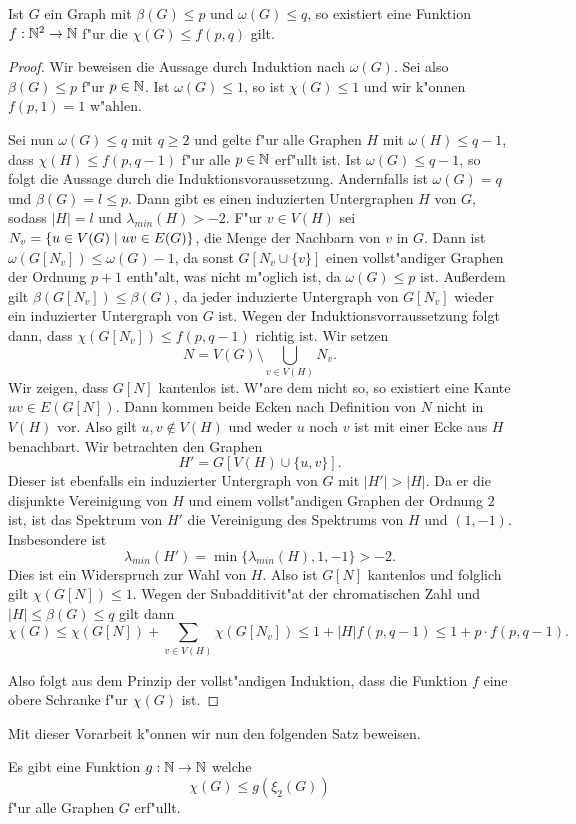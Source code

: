   \begin{lemma}
    Ist $G$ ein Graph mit $\beta(G) \leq p$ und $\omega(G) \leq q$, so existiert eine Funktion $f:{\mathbb{N}} ^{2} \to {\mathbb{N}}$ f"ur die $\chi(G) \leq f(p,q) $ gilt. 
    \label{lem:funktionxilemma}
  \end{lemma}
  \begin{proof}
    Wir beweisen die Aussage durch Induktion nach $\omega(G)$. Sei also $\beta(G) \leq p$ f"ur $p\in {\mathbb{N}}$. Ist $\omega(G) \leq 1$, so ist $\chi(G) \leq 1$ und wir k"onnen $f(p,1) = 1$ w"ahlen.

    Sei nun $\omega(G) \leq q$ mit $q \geq 2$ und gelte f"ur alle Graphen $H$ mit $\omega(H) \leq q-1$, dass $\chi(H) \leq f(p,q-1)$ f"ur alle $p \in {\mathbb{N}}$ erf"ullt ist.
    Ist $\omega(G) \leq q-1$, so folgt die Aussage durch die Induktionsvoraussetzung. Andernfalls ist $\omega(G) = q$ und $\beta(G) = l \leq p$. Dann gibt es einen induzierten Untergraphen $H$ von $G$, sodass $|H|=l$ und $\lambda_{min}(H)> -2$. F"ur $v\in V(H)$ sei $N_v = \{u\in V(G) \;|\; uv\in E(G) \}$, die Menge der Nachbarn von
    $v$ in $G$. Dann ist $\omega(G[N_v]) \leq \omega(G) -1 $, da sonst $G[N_v\cup \{v\}]$ einen vollst"andiger Graphen der Ordnung $p+1$ enth"alt, was nicht m"oglich ist, da $\omega(G) \leq p$ ist. Au{\ss}erdem gilt $\beta(G[N_v]) \leq \beta(G)$, da jeder induzierte Untergraph von $G[N_v]$ wieder ein induzierter Untergraph von $G$ ist. Wegen der Induktionsvorraussetzung folgt dann, dass $\chi(G[N_v]) \leq f(p,q-1)$ richtig ist. 
    Wir setzen $$N = V(G) \setminus \bigcup\limits_{v\in V(H)} N_v.$$ 
    Wir zeigen, dass $G[N]$ kantenlos ist. W"are dem nicht so, so existiert eine Kante $uv\in E(G[N])$. 
    Dann kommen beide Ecken nach Definition von $N$ nicht in $V(H)$ vor. 
    Also gilt $u,v\notin V(H)$ und weder $u$ noch $v$ ist mit einer Ecke aus $H$ benachbart. Wir betrachten den Graphen $$H' = G[V(H) \cup \{u,v\}].$$ Dieser ist ebenfalls ein induzierter Untergraph von $G$ mit $|H'| > |H|$. Da er die disjunkte Vereinigung von $H$ und einem vollst"andigen Graphen der Ordnung $2$ ist, ist das Spektrum von $H'$ die Vereinigung des Spektrums von $H$ und $(1,-1)$. Insbesondere ist $$\lambda_{min}(H') = \min \{\lambda_{min}(H),1,-1\} > -2.$$ 
    Dies ist ein Widerspruch zur Wahl von $H$. Also ist $G[N]$ kantenlos und folglich gilt $\chi(G[N]) \leq 1$. 
    Wegen der Subadditivit"at der chromatischen Zahl und $|H| \leq \beta(G) \leq q$ gilt dann $$\chi(G) \leq \chi(G[N]) + \sum\limits_{v\in V(H)}\chi(G[N_v]) \leq 1 + |H|f(p,q-1)  \leq 1+p\cdot f(p,q-1).$$

    Also folgt aus dem Prinzip der vollst"andigen Induktion, dass die Funktion $f$ eine obere Schranke f"ur $\chi(G)$ ist.
  \end{proof}
  Mit dieser Vorarbeit k"onnen wir nun den folgenden Satz beweisen.
  \begin{theorem}
    Es gibt eine Funktion $g:{\mathbb{N}} \to {\mathbb{N}}$ welche $$\chi(G) \leq g(\xi_{2}(G))$$ f"ur alle Graphen $G$ erf"ullt. 
    \label{thm:funktionxi}
  \end{theorem}

